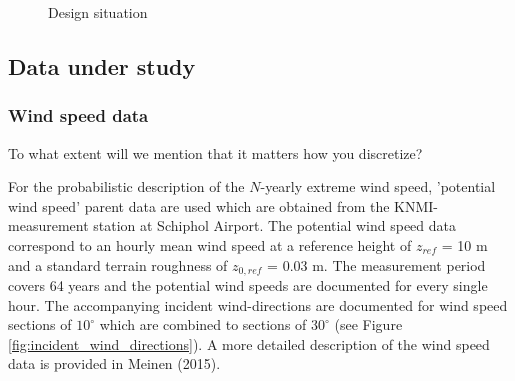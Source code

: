 \begin{figure}[H]
	\centering
	\caption{Design situation}
	\label{tikz:design_situation}
\end{figure}






\subsection{Data under study}

\subsubsection{Wind speed data}
\begin{framed}
	To what extent will we mention that it matters how you discretize?
\end{framed}
For the probabilistic description of the $N$-yearly extreme wind speed, 'potential wind speed' parent data are used which are obtained from the KNMI-measurement station at Schiphol Airport. The potential wind speed data correspond to an hourly mean wind speed  at a reference height of $z_{ref}$ = 10 m and a standard terrain roughness of $z_{0,ref}$ = 0.03 m. The measurement period covers 64 years and the potential wind speeds are documented for every single hour. The accompanying incident wind-directions are documented for wind speed sections of $10^{\circ}$ which are combined to sections of $30^{\circ}$ (see Figure \ref{fig:incident_wind_directions}). 
A more detailed description of the wind speed data is provided in Meinen (2015).  


